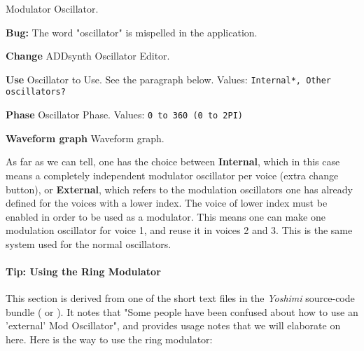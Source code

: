    Modulator Oscillator.

   \textbf{Bug:}
   The word "oscillator" is mispelled in the application.

   \begin{enumber}
      \item \textbf{Change}
         ADDsynth Oscillator Editor.
      \item \textbf{Use}
         Oscillator to Use.
         See the paragraph below.
         Values: \texttt{Internal*, Other oscillators?}
      \item \textbf{Phase}
         Oscillator Phase.
         Values: \texttt{0 to 360 (0 to 2PI)}
      \item \textbf{Waveform graph}
         Waveform graph.
   \end{enumber}

   As far as we can tell, one has the choice between \textbf{Internal},
   which in this case means a completely independent modulator oscillator
   per voice (extra change button), or \textbf{External}, which refers to
   the modulation oscillators one has already defined for the voices with a
   lower index.
   The voice of lower index must be enabled in order to be used as a
   modulator.
   This means one can make one modulation oscillator for voice 1, and reuse it
   in voices 2 and 3.  This is the same system used for the normal
   oscillators.

\paragraph{Tip: Using the Ring Modulator}
\label{paragraph:tips_using_the_ring_modulator}

   This section is derived from one of the short text files in the
   \textsl{Yoshimi} source-code bundle (\cite{yoshimi} or \cite{yoshimi2}).
   It notes that "Some people have
   been confused about how to use an 'external' Mod Oscillator", and
   provides usage notes that we will elaborate on here.  Here is the way to
   use the ring modulator:

